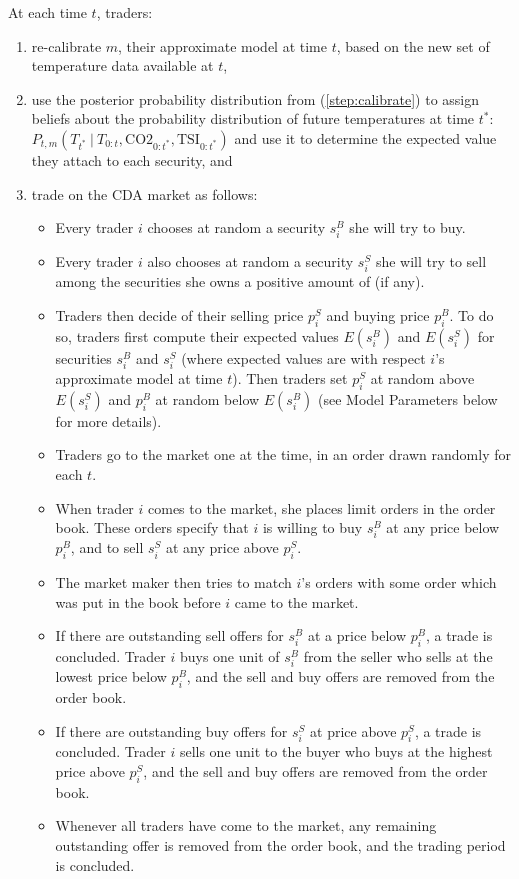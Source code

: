 \documentclass{wscpaperproc}\usepackage[]{graphicx}\usepackage[]{color}
\begin{document}
 At each time $t$, traders:
\begin{enumerate}
\item  re-calibrate $m$, their approximate model at time $t$, based on the new set of temperature data available at $t$,
\label{step:calibrate}
\item  use the posterior probability distribution from (\ref{step:calibrate}) to 
assign beliefs about the probability distribution of future temperatures at time $t^*$: 
$P_{t,m}({T}_{t^*} ~|~ {T}_{0:t}, \text{CO2}_{0:t^*}, \text{TSI}_{0:t^*})$ 
and use it to determine the expected value they attach to each security, and
\item  trade on the CDA market as follows: 
  \begin{itemize}
    \item Every trader $i$ chooses at random a security $s_i^B$ she will try to buy.
    \item Every trader $i$ also chooses at random a security $s_i^S$ she will try to sell among the securities she owns a positive amount of (if any).
    \item Traders then decide of their selling price $p_i^S$ and buying price $p_i^B$. 
  To do so, traders first compute their expected values $E(s_i^B)$ and $E(s_i^S)$ for securities $s_i^B$ and $s_i^S$ (where expected values are with respect $i$'s approximate model at time $t$). 
  Then traders set $p_i^S$ at random above $E(s_i^S)$ and $p_i^B$ at random below $E(s_i^B)$ (see Model Parameters below for more details).
    \item Traders go to the market one at the time, in an order drawn randomly for each $t$.
    \item When trader $i$ comes to the market, she places limit orders in the order book. 
   These orders specify that $i$ is willing to buy $s_i^B$ at any price below $p_i^B$, and to sell $s_i^S$ at any price above $p_i^S$.
    \item The market maker then tries to match $i$'s orders with some order which was put in the book before $i$ came to the market.
    \item If there are  outstanding sell offers for $s_i^B$ at a price below $p_i^B$, a trade is concluded. 
   Trader $i$ buys one unit of $s_i^B$ from the seller who sells at the lowest price below $p_i^B$, and the sell and buy offers are removed from the order book.
    \item If there are outstanding buy offers for $s_i^S$ at price above $p_i^S$, a trade is concluded. 
   Trader $i$ sells one unit to the buyer who buys at the highest price above $p_i^S$, and the sell and buy offers are removed from the order book.
    \item Whenever all traders have come to the market, any remaining outstanding offer is removed from the order book, and the trading period is concluded. 
  \end{itemize}
\end{enumerate}
\end{document}
